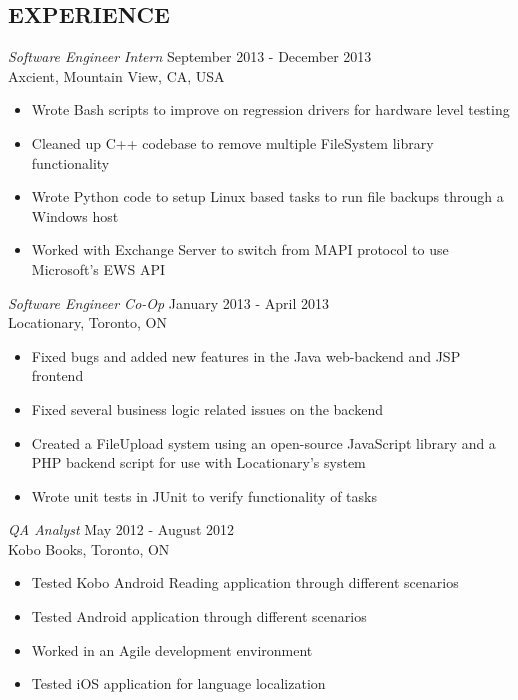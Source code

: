 \documentclass[margin]{res}
\begin{document}
\begin{resume}
\section{EXPERIENCE} 
				{\sl Software Engineer Intern} \hfill            September 2013 - December 2013 \\
				Axcient, Mountain View, CA, USA
                 \begin{itemize}  \itemsep -2pt %
                 \item Wrote Bash scripts to improve on regression drivers for hardware level testing
                 \item Cleaned up C++ codebase to remove multiple FileSystem library functionality 
                 \item Wrote Python code to setup Linux based tasks to run file backups through a Windows host
                 \item Worked with Exchange Server to switch from MAPI protocol to use Microsoft's EWS API
                 \end{itemize} 
				{\sl Software Engineer Co-Op} \hfill January 2013 - April 2013 \\
				Locationary, Toronto, ON 
                 \begin{itemize}  \itemsep -2pt %
                 \item Fixed bugs and added new features in the Java web-backend and JSP frontend
                 \item Fixed several business logic related issues on the backend
                \item Created a FileUpload system using an open-source JavaScript library and a PHP backend script for use with Locationary's system
                \item Wrote unit tests in JUnit to verify functionality of tasks
                \end{itemize}
                {\sl QA Analyst} \hfill            May 2012 - August 2012 \\
		          Kobo Books, Toronto, ON
                   \begin{itemize}  \itemsep -2pt %
                  \item Tested Kobo Android Reading application through different scenarios
                  \item Tested Android application through different scenarios
                   \item Worked in an Agile development environment
                   \item Tested iOS application for language localization
                   \end{itemize} 
 

\end{resume}
\end{document}
